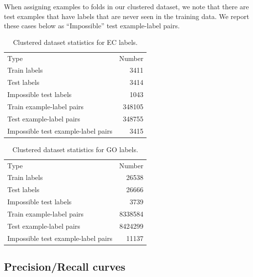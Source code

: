 \DIFaddend When assigning examples to folds in our clustered dataset, we note that there are test examples that have labels that are never seen in the training data. We report these cases below as ``Impossible'' test example-label pairs.
\begin{table}[htbp]
\centering
\begin{tabular}{|l|r|}
\hline
                                Type &  Number \\
\Xhline{2pt}
                        Train labels &    3411 \\
\hline
                         Test labels &    3414 \\
\hline
              Impossible test labels &    1043 \\
\hline
           Train example-label pairs &  348105 \\
\hline
            Test example-label pairs &  348755 \\
\hline
 Impossible test example-label pairs &    3415 \\
\hline
\end{tabular}
\caption{Clustered dataset statistics for EC labels.}
\end{table}
\begin{table}[htbp]
\centering
\begin{tabular}{|l|r|}
\hline
                                Type &   Number \\
\Xhline{2pt}
                        Train labels &    26538 \\
\hline
                         Test labels &    26666 \\
\hline
              Impossible test labels &     3739 \\
\hline
           Train example-label pairs &  8338584 \\
\hline
            Test example-label pairs &  8424299 \\
\hline
 Impossible test example-label pairs &    11137 \\
\hline
\end{tabular}
\caption{Clustered dataset statistics for GO labels.}
\end{table}
\DIFdelbegin %
\DIFdelend \DIFaddbegin \clearpage
\DIFaddend \subsection{Precision/Recall curves}

